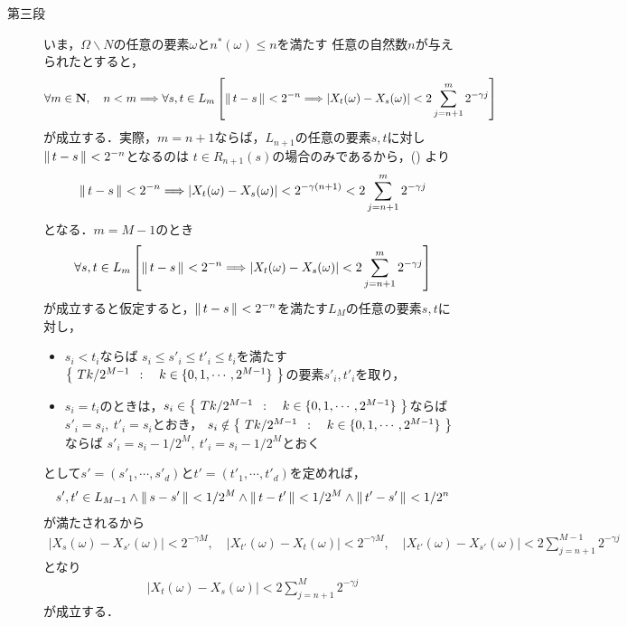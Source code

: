 \begin{prf}
\begin{description}
			\item[第三段]
				いま，$\Omega \backslash N$の任意の要素$\omega$と$n^*(\omega) \leq n$を満たす
				任意の自然数$n$が与えられたとすると，
				\begin{align}
					\forall m \in \mathbf{N},\quad
					n < m \Longrightarrow \forall s,t \in L_m\left[
					\left\|\, t-s\, \right\|_{} < 2^{-n} \Longrightarrow 
					|X_t(\omega) - X_s(\omega)|<2\sum_{j=n+1}^m 2^{-\gamma j}\right]
				\end{align}
				が成立する．実際，$m=n+1$ならば，$L_{n+1}$の任意の要素$s,t$に対し
				$\left\|\, t-s\, \right\|_{} < 2^{-n}$となるのは
				$t \in R_{n+1}(s)$の場合のみであるから，()
				より
				\begin{align}
					\left\|\, t-s\, \right\|_{} < 2^{-n} \Longrightarrow 
					|X_t(\omega) - X_s(\omega)| < 2^{-\gamma(n+1)}
					< 2\sum_{j=n+1}^m 2^{-\gamma j}
				\end{align}
				となる．$m=M-1$のとき
				\begin{align}
					\forall s,t \in L_m\left[
					\left\|\, t-s\, \right\|_{} < 2^{-n} \Longrightarrow 
					|X_t(\omega) - X_s(\omega)|<2\sum_{j=n+1}^m 2^{-\gamma j}\right]
				\end{align}
				が成立すると仮定すると，$\left\|\, t-s\, \right\|_{} < 2^{-n}$を満たす$L_M$の任意の要素$s,t$に対し，
				\begin{itemize}
					\item $s_i < t_i$ならば
						$s_i \leq s'_i \leq t'_i \leq t_i$を満たす
						$\left\{\ Tk/2^{M-1}\ \, : \quad k\in\{0,1,\cdots,2^{M-1}\}\ \right\}$の要素$s'_i,t'_i$を取り，
					
					\item $s_i = t_i$のときは，$s_i \in \left\{\ Tk/2^{M-1}\ \, : \quad k\in\{0,1,\cdots,2^{M-1}\}\ \right\}$ならば
						$s'_i = s_i,\ t'_i = s_i$とおき，
						$s_i \notin \left\{\ Tk/2^{M-1}\ \, : \quad k\in\{0,1,\cdots,2^{M-1}\}\ \right\}$ならば
						$s'_i = s_i-1/2^M,\ t'_i = s_i-1/2^M$とおく
				\end{itemize}
				として$s'=(s'_1,\cdots,s'_d)$と$t'=(t'_1,\cdots,t'_d)$を定めれば，
				\begin{align}
					s',t' \in L_{M-1}\wedge
					\left\|\, s-s'\, \right\|_{} < 1/2^M \wedge \left\|\, t-t'\, \right\|_{} < 1/2^M
					\wedge \left\|\, t'-s'\, \right\|_{} < 1/2^n
				\end{align}
				が満たされるから
				\begin{align}
					|X_s(\omega) - X_{s'}(\omega)| < 2^{-\gamma M},
					\quad |X_{t'}(\omega) - X_t(\omega)| < 2^{-\gamma M},
					\quad |X_{t'}(\omega) - X_{s'}(\omega)|  < 2\sum_{j=n+1}^{M-1} 2^{-\gamma j}
				\end{align}
				となり
				\begin{align}
					|X_t(\omega) - X_s(\omega)|<2\sum_{j=n+1}^M 2^{-\gamma j}
				\end{align}
				が成立する．
			

\end{description}
\end{prf}
